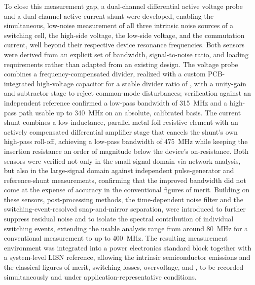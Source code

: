 To close this measurement gap, a dual-channel differential active voltage probe and a dual-channel active current shunt were developed, enabling the simultaneous, low-noise measurement of all three intrinsic noise sources of a switching cell, the high-side voltage, the low-side voltage, and the commutation current, well beyond their respective device resonance frequencies.
Both sensors were derived from an explicit set of bandwidth, signal-to-noise ratio, and loading requirements rather than adapted from an existing design.
The voltage probe combines a frequency-compensated divider, realized with a custom PCB-integrated high-voltage capacitor for a stable divider ratio of , with a unity-gain and subtractor stage to reject common-mode disturbances; verification against an independent reference confirmed a low-pass bandwidth of \SI{315}{MHz} and a high-pass path usable up to \SI{340}{MHz} on an absolute, calibrated basis.
The current shunt combines a low-inductance, parallel metal-foil resistive element with an actively compensated differential amplifier stage that cancels the shunt's own high-pass roll-off, achieving a low-pass bandwidth of \SI{475}{MHz} while keeping the insertion resistance an order of magnitude below the device's on-resistance.
Both sensors were verified not only in the small-signal domain via network analysis, but also in the large-signal domain against independent pulse-generator and reference-shunt measurements, confirming that the improved bandwidth did not come at the expense of accuracy in the conventional figures of merit.
Building on these sensors, post-processing methods, the time-dependent noise filter and the switching-event-resolved snap-and-mirror separation, were introduced to further suppress residual noise and to isolate the spectral contribution of individual switching events, extending the usable analysis range from around \SI{80}{MHz} for a conventional measurement to up to \SI{400}{MHz}.
The resulting measurement environment was integrated into a power electronics standard block together with a system-level LISN reference, allowing the intrinsic semiconductor emissions and the classical figures of merit, switching losses, overvoltage, and , to be recorded simultaneously and under application-representative conditions.


